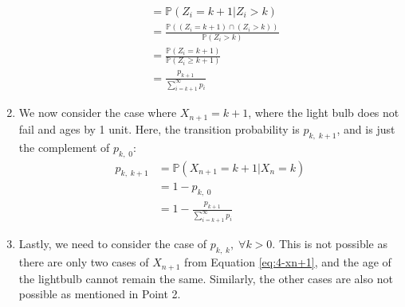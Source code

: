 \documentclass[12pt]{article}
\begin{document}
\begin{enumerate}
\begin{align*}
        &= \mathbb{P}(Z_i = k + 1 | Z_i > k) \\ 
        &= \frac{ \mathbb{P}\left((Z_i = k + 1) \cap (Z_i > k) \right)}{ \mathbb{P}(Z_i > k)} \\ 
        &= \frac{ \mathbb{P}\left(Z_i = k + 1\right)}{ \mathbb{P}(Z_i \geq  k+1)} \\ 
        &= \frac{p_{k+1}}{ \sum_{i=k+1}^{\infty} p_i}
    \end{align*} 
    \item We now consider the case where $X_{n+1} = k+1$, where the light bulb does not fail and ages by 1 unit. Here, the transition probability is $p_{k, \; k+1}$, and is just the complement of $p_{k, \; 0}$: \begin{align*}
        p_{k, \; k+1} &= \mathbb{P}(X_{n+1} = k + 1 | X_n = k) \\ 
        &= 1 - p_{k, \; 0} \\ 
        &= 1 - \frac{p_{k+1}}{ \sum_{i=k+1}^{\infty} p_i}
    \end{align*}
    \item Lastly, we need to consider the case of $p_{k, \; k}, \; \forall k > 0$. This is not possible as there are only two cases of $X_{n+1}$ from Equation \ref{eq:4-xn+1}, and the age of the lightbulb cannot remain the same. Similarly, the other cases are also not possible as mentioned in Point 2. 
\end{enumerate}
\end{document}
